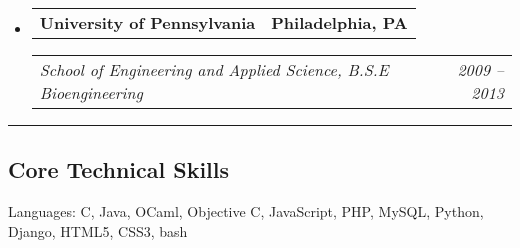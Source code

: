 \documentclass[10pt,letterpaper]{article}
\makeatletter
\newenvironment{indentsection}[1]%
{\begin{list}{}%
	{\setlength{\leftmargin}{#1}}%
	\item[]%
}
{\end{list}}
\newcommand{\headerrow}[2]
{\begin{tabular*}{\linewidth}{l@{\extracolsep{\fill}}r}
	#1 &
	#2 \\
\end{tabular*}}
\makeatother
\begin{document}
\begin{itemize}
	\parskip=0.1em

	\item 
	\headerrow
		{\textbf{University of Pennsylvania}}
		{\textbf{Philadelphia, PA}}
	
	\headerrow
		{\emph{School of Engineering and Applied Science, B.S.E Bioengineering}}
		{\emph{2009 -- 2013}}

\end{itemize}


\hrule
\vspace{-0.4em}
\subsection*{Core Technical Skills}

\begin{indentsection}{\parindent}
\begin{description*}
	\item[Languages:]
	C, Java, OCaml, Objective C, JavaScript, PHP, MySQL, Python, Django, HTML5, CSS3, bash
\end{description*}
\end{indentsection}
\end{document}
